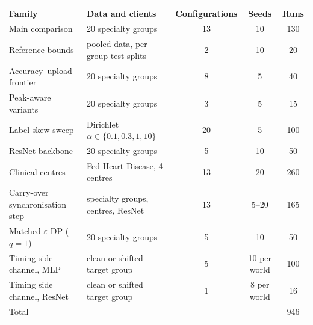\begin{tabular}{@{}llccc@{}}
\toprule
Family & Data and clients & Configurations & Seeds & Runs\\
\midrule
Main comparison & 20 specialty groups & 13 & 10 & 130\\
Reference bounds & pooled data, per-group test splits & 2 & 10 & 20\\
Accuracy--upload frontier & 20 specialty groups & 8 & 5 & 40\\
Peak-aware variants & 20 specialty groups & 3 & 5 & 15\\
Label-skew sweep & Dirichlet $\alpha\in\{0.1,0.3,1,10\}$ & 20 & 5 & 100\\
ResNet backbone & 20 specialty groups & 5 & 10 & 50\\
Clinical centres & Fed-Heart-Disease, 4 centres & 13 & 20 & 260\\
Carry-over synchronisation step & specialty groups, centres, ResNet & 13 & 5--20 & 165\\
Matched-$\varepsilon$ DP ($q=1$) & 20 specialty groups & 5 & 10 & 50\\
Timing side channel, MLP & clean or shifted target group & 5 & 10 per world & 100\\
Timing side channel, ResNet & clean or shifted target group & 1 & 8 per world & 16\\
\midrule
Total &  &  &  & 946\\
\bottomrule
\end{tabular}
